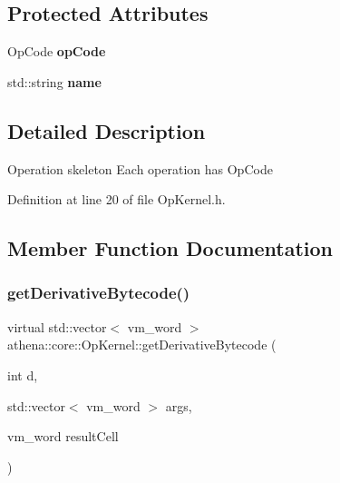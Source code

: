 \subsection*{Protected Attributes}
\begin{DoxyCompactItemize}
\item 
\mbox{\label{classathena_1_1core_1_1_op_kernel_ae77be87c4209176d927a6d83bcbf3592}} 
Op\+Code {\bfseries op\+Code}
\item 
\mbox{\label{classathena_1_1core_1_1_op_kernel_a5970ac8cb25cd956112a471d647789be}} 
std\+::string {\bfseries name}
\end{DoxyCompactItemize}


\subsection{Detailed Description}
Operation skeleton Each operation has Op\+Code 

Definition at line 20 of file Op\+Kernel.\+h.



\subsection{Member Function Documentation}
\mbox{\label{classathena_1_1core_1_1_op_kernel_ad500db1afc5a7c10acff8ecb8f1bee4d}} 
\subsubsection{\texorpdfstring{get\+Derivative\+Bytecode()}{getDerivativeBytecode()}}
{\footnotesize\ttfamily virtual std\+::vector$<$ vm\+\_\+word $>$ athena\+::core\+::\+Op\+Kernel\+::get\+Derivative\+Bytecode (\begin{DoxyParamCaption}\item[{int}]{d,  }\item[{std\+::vector$<$ vm\+\_\+word $>$}]{args,  }\item[{vm\+\_\+word}]{result\+Cell }\end{DoxyParamCaption})\hspace{0.3cm}{\ttfamily [pure virtual]}}

